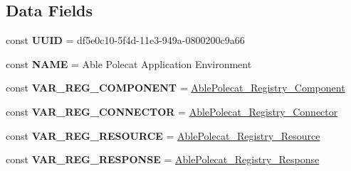 \subsection*{Data Fields}
\begin{DoxyCompactItemize}
\item 
\hypertarget{class_able_polecat___environment___application_a74b892c8c0b86bf9d04c5819898c51e7}{}const {\bfseries U\+U\+I\+D} = \textquotesingle{}df5e0c10-\/5f4d-\/11e3-\/949a-\/0800200c9a66\textquotesingle{}\label{class_able_polecat___environment___application_a74b892c8c0b86bf9d04c5819898c51e7}

\item 
\hypertarget{class_able_polecat___environment___application_a244352f035b82b20b0efa506167fd862}{}const {\bfseries N\+A\+M\+E} = \textquotesingle{}Able Polecat Application Environment\textquotesingle{}\label{class_able_polecat___environment___application_a244352f035b82b20b0efa506167fd862}

\item 
\hypertarget{class_able_polecat___environment___application_ab34f939158f9695d2c17824629ddb8d6}{}const {\bfseries V\+A\+R\+\_\+\+R\+E\+G\+\_\+\+C\+O\+M\+P\+O\+N\+E\+N\+T} = \textquotesingle{}\hyperlink{class_able_polecat___registry___component}{Able\+Polecat\+\_\+\+Registry\+\_\+\+Component}\textquotesingle{}\label{class_able_polecat___environment___application_ab34f939158f9695d2c17824629ddb8d6}

\item 
\hypertarget{class_able_polecat___environment___application_a54bdcfef5d242c797334439c7de38731}{}const {\bfseries V\+A\+R\+\_\+\+R\+E\+G\+\_\+\+C\+O\+N\+N\+E\+C\+T\+O\+R} = \textquotesingle{}\hyperlink{class_able_polecat___registry___connector}{Able\+Polecat\+\_\+\+Registry\+\_\+\+Connector}\textquotesingle{}\label{class_able_polecat___environment___application_a54bdcfef5d242c797334439c7de38731}

\item 
\hypertarget{class_able_polecat___environment___application_a8def80f5a279fe2c1dadeea0877fab72}{}const {\bfseries V\+A\+R\+\_\+\+R\+E\+G\+\_\+\+R\+E\+S\+O\+U\+R\+C\+E} = \textquotesingle{}\hyperlink{class_able_polecat___registry___resource}{Able\+Polecat\+\_\+\+Registry\+\_\+\+Resource}\textquotesingle{}\label{class_able_polecat___environment___application_a8def80f5a279fe2c1dadeea0877fab72}

\item 
\hypertarget{class_able_polecat___environment___application_ad52f14bd273a92ce525f7d48324fffc7}{}const {\bfseries V\+A\+R\+\_\+\+R\+E\+G\+\_\+\+R\+E\+S\+P\+O\+N\+S\+E} = \textquotesingle{}\hyperlink{class_able_polecat___registry___response}{Able\+Polecat\+\_\+\+Registry\+\_\+\+Response}\textquotesingle{}\label{class_able_polecat___environment___application_ad52f14bd273a92ce525f7d48324fffc7}


\end{DoxyCompactItemize}

